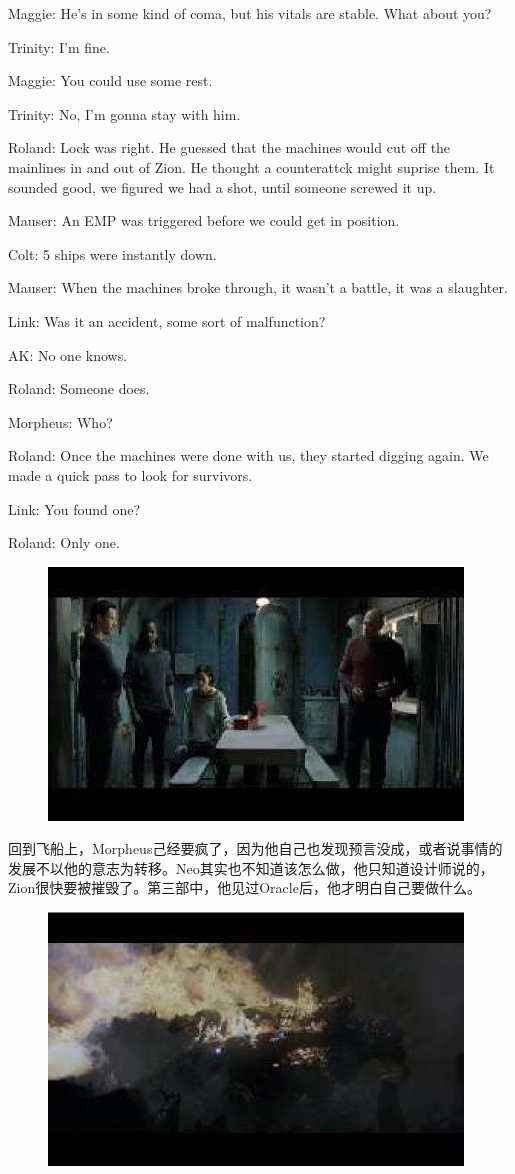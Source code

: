 \documentclass[UTF8]{ctexart}
\newenvironment{myquote}{\color{green} \setlength{\leftskip}{6em} \setlength{\rightskip}{4em} \setlength{\parindent}{-2em}}{\par}
\begin{document}
\begin{myquote}
Maggie: He's in some kind of coma, but his vitals are stable. What about you?

Trinity: I'm fine.

Maggie: You could use some rest.

Trinity: No, I'm gonna stay with him.

Roland: Lock was right. He guessed that the machines would cut off the mainlines in and out of Zion. He thought a counterattck might suprise them. It sounded good, we figured we had a shot, until someone screwed it up.

Mauser: An EMP was triggered before we could get in position.

Colt: 5 ships were instantly down.

Mauser: When the machines broke through, it wasn't a battle, it was a slaughter.

Link: Was it an accident, some sort of malfunction?

AK: No one knows.

Roland: Someone does.

Morpheus: Who?

Roland: Once the machines were done with us, they started digging again. We made a quick pass to look for survivors.

Link: You found one?

Roland: Only one.
\end{myquote}

\begin{figure}[htb]
\centering
\includegraphics[width=0.5\linewidth]{fig/read_reloaded-174}
\end{figure}

回到飞船上，Morpheus己经要疯了，因为他自己也发现预言没成，或者说事情的发展不以他的意志为转移。Neo其实也不知道该怎么做，他只知道设计师说的，Zion很快要被摧毁了。第三部中，他见过Oracle后，他才明白自己要做什么。

\begin{figure}[htb]
\centering
\includegraphics[width=0.5\linewidth]{fig/read_reloaded-175}
\end{figure}
\end{document}
